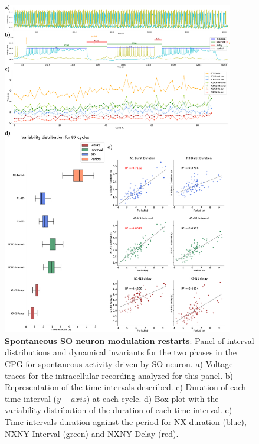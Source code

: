 \begin{figure}[htbp]
	\centering
	\includegraphics[width=0.9\textwidth]{./img/invariants/data/SUSSEX/prep4_so_driven_2/images/panel_with_intervals.pdf}
	\caption{\textbf{Spontaneous SO neuron modulation restarts}: Panel of interval distributions and dynamical invariants for the two phases in the CPG for spontaneous activity driven by SO neuron. a) Voltage traces for the intracellular recording analyzed for this panel. b) Representation of the time-intervals described. c) Duration of each time interval ($y-axis$) at each cycle. d) Box-plot with the variability distribution of the duration of each time-interval. e) Time-intervals duration against the period for NX-duration (blue), NXNY-Interval (green) and NXNY-Delay (red).}
	\label{fig:so spontaneous invariants 1}
\end{figure}



